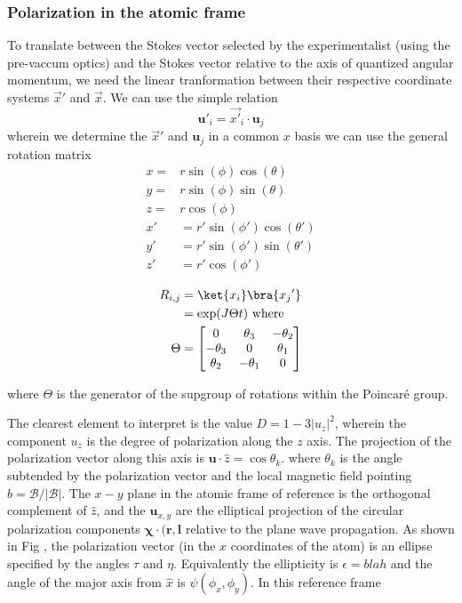 \subsubsection{Polarization in the atomic frame}

	To translate between the Stokes vector selected by the experimentalist (using the pre-vaccum optics) and the Stokes vector relative to the axis of quantized angular momentum, we need the linear tranformation between their respective coordinate systems $\vec{x}'$ and $\vec{x}$. 
	We can use the simple relation
	\begin{equation}
		\mathbf{u}'_{i}=\vec{x'}_i\cdot\mathbf{u}_j
	\end{equation}
	wherein we determine the $\vec{x}'$ and $\mathbf{u}_j$ in a common $x$ basis we can use the general rotation matrix
	\begin{align}
	x =& r \sin(\phi)\cos(\theta)\\
	y =& r \sin(\phi)\sin(\theta)\\
	z =& r \cos(\phi)\\
	x' &= r' \sin(\phi')\cos(\theta')\\
	y' &= r' \sin(\phi')\sin(\theta')\\
	z' &= r' \cos(\phi')
	\end{align}
	
	\begin{align}
	R_{i,j}  &= \ket{x_i}\bra{{x_j}'}	\\
	&= \exp(J \Theta t)~\mathrm{where}\\
	\Theta&= \begin{bmatrix}
		 0 & \theta_3 & -\theta_2\\
		 -\theta_3 & 0 &\theta_1 \\
		 \theta_2 & -\theta_1 & 0
		\end{bmatrix}
	\end{align}

	where $\Theta$ is the generator of the supgroup of rotations within the Poincar\'{e} group.

	The clearest element to interpret is the value $D = 1-3|u_z|^2$, wherein the component $u_z$ is the degree of polarization along the $z$ axis. 
	The projection of the polarization vector along this axis is $\mathbf{u}\cdot\hat{z} = \cos{\theta_k}$.
	where $\theta_k$ is the angle subtended by the polarization vector and the local magnetic field pointing $\hat{b} = \mathcal{B}/|\mathcal{B}|$.
	The $x-y$ plane in the atomic frame of reference is the orthogonal complement of $\hat{z}$, and the $\mathbf{u}_{x,y}$ are the elliptical projection of the circular polarization components $\mathbf{\chi} \cdot (\mathbf{r},\mathbf{l}$ relative to the plane wave propagation.
	As shown in Fig , the polarization vector (in the $x$ coordinates of the atom) is an ellipse specified by the angles $\tau$ and $\eta$.
	Equivalently the ellipticity is $\epsilon=blah$ and the angle of the major axis from $\hat{x}$ is $\psi(\phi_x,\phi_y)$.
	In this reference frame 
	
